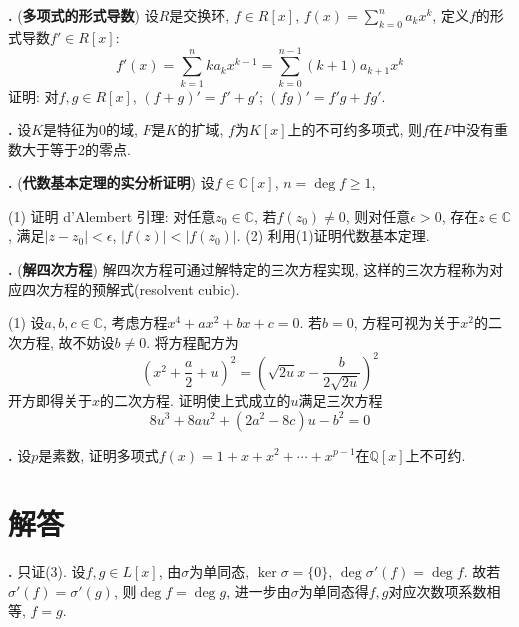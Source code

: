 \par \textbf{\theprobpoly .} (\textbf{多项式的形式导数}) 设$R$是交换环, $f\in R[x]$, $f(x)=\sum_{k=0}^n a_kx^k$, 定义$f$的形式导数$f'\in R[x]$: 
\begin{equation}
    f'(x)=\sum_{k=1}^{n} ka_kx^{k-1} = \sum_{k=0}^{n-1} (k+1)a_{k+1}x^{k}
\end{equation}
证明: 对$f,g\in R[x]$, $(f+g)'=f'+g'$; $(fg)'=f'g+fg'$.

\par \textbf{\theprobpoly .} \cite{GTS} 设$K$是特征为0的域, $F$是$K$的扩域, $f$为$K[x]$上的不可约多项式, 则$f$在$F$中没有重数大于等于2的零点. 

\par \textbf{\theprobpoly .} (\textbf{代数基本定理的实分析证明}) 设$f\in \mathbb{C}[x]$, $n=\deg f\ge 1$, 
\par (1) 证明 d'Alembert 引理: 对任意$z_0 \in \mathbb{C}$, 若$f(z_0)\neq 0$, 则对任意$\epsilon > 0$, 存在$z \in \mathbb{C}$, 满足$|z-z_0|<\epsilon$, $|f(z)|<|f(z_0)|$. (2) 利用(1)证明代数基本定理. 

\par \textbf{\theprobpoly .} (\textbf{解四次方程}) 解四次方程可通过解特定的三次方程实现, 这样的三次方程称为对应四次方程的预解式(resolvent cubic). 
\par (1) 设$a,b,c \in \mathbb{C}$, 考虑方程$x^4+ax^2+bx+c=0$. 若$b=0$, 方程可视为关于$x^2$的二次方程, 故不妨设$b\neq 0$. 将方程配方为
\begin{equation}
    \left(x^2 + \frac{a}{2} + u\right)^2 = \left(\sqrt{2u}x-\frac{b}{2\sqrt{2u}}\right)^2
\label{eq:quartic_sq}
\end{equation}
开方即得关于$x$的二次方程. 证明使上式成立的$u$满足三次方程
\begin{equation}
    8u^3+8au^2+(2a^2-8c)u-b^2=0
\end{equation}

\par \textbf{\theprobpoly .} \cite{GTS} 设$p$是素数, 证明多项式$f(x)=1+x+x^2+\cdots+x^{p-1}$在$\mathbb{Q}[x]$上不可约. 


\section*{解答}

\par \textbf{\thesolpoly .} 只证(3). 设$f,g\in L[x]$, 由$\sigma$为单同态, $\ker \sigma = \{0\}$, $\deg \sigma'(f) = \deg f$. 故若$\sigma'(f)=\sigma'(g)$, 则$\deg f = \deg g$, 进一步由$\sigma$为单同态得$f,g$对应次数项系数相等, $f=g$. 

